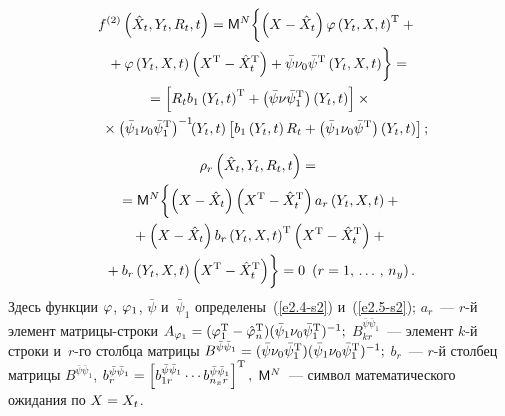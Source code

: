 \begin{multicols}{2}
\vspace*{-12pt}
    
    \noindent
    \begin{multline*}
\hspace*{-2.52pt}f^{(2)}\left(\hat X_t, Y_t,R_t,t\right)=
{\sf M}^N\biggl\{  \left(X-\hat X_t\right)\varphi\left(Y_t,X,t\right)^{\mathrm{T}} + {}\\
{}+
\varphi \left(Y_t,X,t\right) \left(X^{\mathrm{T}}-\hat X_t^{\mathrm{T}}\right) +
\bar\psi\nu_0\bar\psi^{\mathrm{T}} \left(Y_t,X,t\right)\biggr\}={}\\
{}=\left[ 
R_t b_1 \left(Y_t, t\right)^{\mathrm{T}} + 
\left(\bar \psi\nu\bar \psi_1^{\mathrm{T}}\right)
\left(Y_t, t\right)\right] \times{}\\
{}\times
\left(\bar \psi_1\nu_0\bar \psi_1^{\mathrm{T}}\right)^{-1}\!\! \left(Y_t, t\right)
 \left[ 
b_1 \left(Y_t, t\right) R_t + 
\left(\bar \psi_1\nu_0\bar \psi^{\mathrm{T}}\right)\left(Y_t, t\right)
\right];\hspace*{-8.054pt}
\end{multline*}

\vspace*{-12pt}
    
    \noindent
    \begin{multline*}
    \rho_r\left(\hat X_t,Y_t, R_t,t\right)={}\\
    {}=
    {\sf M}^N \biggl\{  
    \left(X-\hat X_t\right)\left(X^{\mathrm{T}}-\hat X_t^{\mathrm{T}}\right) 
    a_r \left(Y_t,X,t\right)+{}\\
{}+ \left(X-\hat X_t\right) b_r\left(Y_t,X,t\right)^{\mathrm{T}} 
\left(X^{\mathrm{T}}-\hat X_t^{\mathrm{T}}\right)+ {}\\
{}+
b_r \left(Y_t,X,t\right) \left(X^{\mathrm{T}}-\hat X_t^{\mathrm{T}}\right)\biggr\} =0 
\enskip (r=1,\,\ldots\,,\, n_y)\,.
\end{multline*}
Здесь функции $\varphi$, $\varphi_1$, $\bar \psi$ и~$\bar \psi_1$ 
определены~(\ref{e2.4-s2}) и~(\ref{e2.5-s2}); 
$a_r$~--- $r$-й элемент мат\-ри\-цы-стро\-ки
    $A_{\vrp_1} \hm= (\vrp_1^{\mathrm{T}} \hm- \hat\vrp_n^{\mathrm{T}})(\bar \psi_1 \nu_0\bar \psi_1^{\mathrm{T}})^{-1};$
$B_{kr}^{\bar \psi\bar \psi_1}$~--- элемент $k$-й строки и~$r$-го столб\-ца матрицы
    $B^{\bar \psi\bar \psi_1} \hm= (\bar \psi\nu_0\bar \psi_1^{\mathrm{T}})
    (\bar \psi_1\nu_0\bar \psi_1^{\mathrm{T}})^{-1};$
$b_r$~--- $r$-й столбец матрицы $B^{\bar \psi\bar \psi_1}$,
    $b_r^{\bar \psi\bar \psi_1} \hm= \lk b_{1r}^{\bar \psi\bar \psi_1}\cdots 
    b_{n_x r}^{\bar \psi\bar \psi_1}\rk^{\mathrm{T}},$
${\sf M}^N$~--- символ математического ожидания по $X\hm=X_t$.


\end{multicols}
